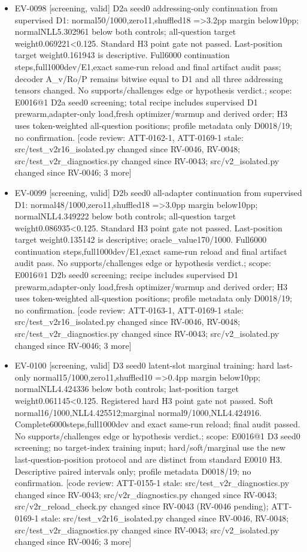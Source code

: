 \documentclass[11pt]{article}
\begin{document}
\begin{itemize}
\item EV-0098 [screening, valid] D2a seed0 addressing-only continuation from supervised D1: normal50/1000,zero11,shuffled18 =\textgreater{}3.2pp margin below10pp; normalNLL5.302961 below both controls; all-question target weight0.069221\textless{}0.125. Standard H3 point gate not passed. Last-position target weight0.161943 is descriptive. Full6000 continuation steps,full1000dev/E1,exact same-run reload and final artifact audit pass; decoder A\_v/Ro/P remains bitwise equal to D1 and all three addressing tensors changed. No supports/challenges edge or hypothesis verdict.; scope: E0016@1 D2a seed0 screening; total recipe includes supervised D1 prewarm,adapter-only load,fresh optimizer/warmup and derived order; H3 uses token-weighted all-question positions; profile metadata only D0018/19; no confirmation. [code review: ATT-0162-1, ATT-0169-1 stale: src/test\_v2r16\_isolated.py changed since RV-0046, RV-0048; src/test\_v2r\_diagnostics.py changed since RV-0043; src/v2\_isolated.py changed since RV-0046; 3 more]
\item EV-0099 [screening, valid] D2b seed0 all-adapter continuation from supervised D1: normal48/1000,zero11,shuffled18 =\textgreater{}3.0pp margin below10pp; normalNLL4.349222 below both controls; all-question target weight0.086935\textless{}0.125. Standard H3 point gate not passed. Last-position target weight0.135142 is descriptive; oracle\_value170/1000. Full6000 continuation steps,full1000dev/E1,exact same-run reload and final artifact audit pass. No supports/challenges edge or hypothesis verdict.; scope: E0016@1 D2b seed0 screening; recipe includes supervised D1 prewarm,adapter-only load,fresh optimizer/warmup and derived order; H3 uses token-weighted all-question positions; profile metadata only D0018/19; no confirmation. [code review: ATT-0163-1, ATT-0169-1 stale: src/test\_v2r16\_isolated.py changed since RV-0046, RV-0048; src/test\_v2r\_diagnostics.py changed since RV-0043; src/v2\_isolated.py changed since RV-0046; 3 more]
\item EV-0100 [screening, valid] D3 seed0 latent-slot marginal training: hard last-only normal15/1000,zero11,shuffled10 =\textgreater{}0.4pp margin below10pp; normalNLL4.424336 below both controls; last-position target weight0.061145\textless{}0.125. Registered hard H3 point gate not passed. Soft normal16/1000,NLL4.425512;marginal normal9/1000,NLL4.424916. Complete6000steps,full1000dev and exact same-run reload; final audit passed. No supports/challenges edge or hypothesis verdict.; scope: E0016@1 D3 seed0 screening; no target-index training input; hard/soft/marginal use the new last-question-position protocol and are distinct from standard E0010 H3. Descriptive paired intervals only; profile metadata D0018/19; no confirmation. [code review: ATT-0155-1 stale: src/test\_v2r\_diagnostics.py changed since RV-0043; src/v2r\_diagnostics.py changed since RV-0043; src/v2r\_reload\_check.py changed since RV-0043 (RV-0046 pending); ATT-0169-1 stale: src/test\_v2r16\_isolated.py changed since RV-0046, RV-0048; src/test\_v2r\_diagnostics.py changed since RV-0043; src/v2\_isolated.py changed since RV-0046; 3 more]

\end{itemize}
\end{document}
